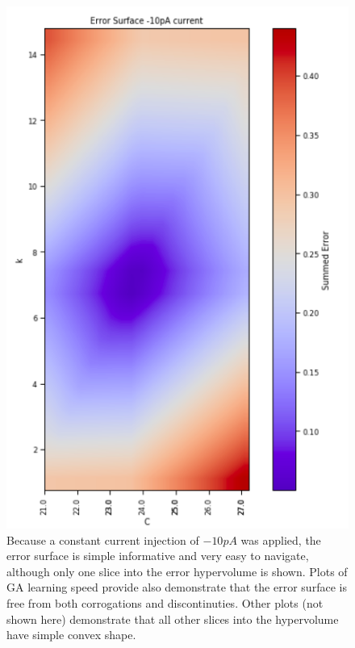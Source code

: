 

\begin{figure}
    \centering
    \includegraphics[scale=0.7]{figures/friendly_error_surface.png}
    \caption[Using only constant currents causes simple tractable error surfaces]{Because a constant current injection of $-10pA$ was applied, the error surface is simple informative and very easy to navigate, although only one slice into the error hypervolume is shown. Plots of GA learning speed provide also demonstrate that the error surface is free from both corrogations and discontinuties. Other plots (not shown here) demonstrate that all other slices into the hypervolume have simple convex shape.}
    \label{fig:constant_current}
\end{figure}


